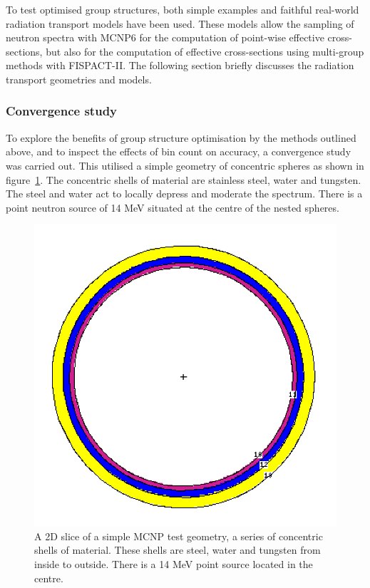 To test optimised group structures, both simple examples and faithful real-world radiation transport models have been used. These models allow the sampling of neutron spectra with MCNP6 for the computation of point-wise effective cross-sections, but also for the computation of effective cross-sections using multi-group methods with FISPACT-II. The following section briefly discusses the radiation transport geometries and models.

\subsubsection{Convergence study}
\label{subsubsec:conv}
To explore the benefits of group structure optimisation by the methods outlined above, and to inspect the effects of bin count on accuracy, a convergence study was carried out. This utilised a simple geometry of concentric spheres as shown in figure~\ref{fig:conv_mcnp}. The concentric shells of material are stainless steel, water and tungsten. The steel and water act to locally depress and moderate the spectrum. There is a point neutron source of 14 MeV situated at the centre of the nested spheres. 

\begin{figure}[H]
  \centering
  \includegraphics[width=0.7\linewidth]{conv_mcnp}
  \caption[Slice of MCNP test geometry.]{A 2D slice of a simple MCNP test geometry, a series of concentric shells of material. These shells are steel, water and tungsten from inside to outside. There is a 14 MeV point source located in the centre.}
  \label{fig:conv_mcnp}
\end{figure}

